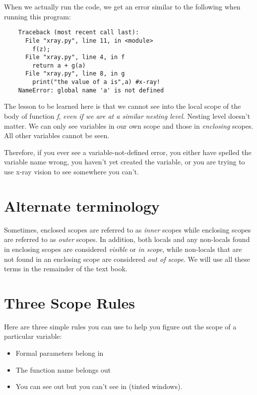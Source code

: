 When we actually run the code,
we get an error similar to the following when running this program:

\begin{verbatim}
    Traceback (most recent call last):
      File "xray.py", line 11, in <module>
        f(z);
      File "xray.py", line 4, in f
        return a + g(a)
      File "xray.py", line 8, in g
        print("the value of a is",a) #x-ray!
    NameError: global name 'a' is not defined
\end{verbatim}

The lesson to be learned here is
that we cannot see into
the local scope of the body of function {\it f},
{\it even if we are at a similar nesting level}.
Nesting level doesn't matter. We can only see variables
in our own scope and those in {\it enclosing} scopes.
All other variables cannot be seen.

Therefore, if you ever see a variable-not-defined error,
you either have spelled the variable name wrong, you haven't
yet created the variable, or you are trying to use x-ray vision
to see somewhere you can't. 

\section{Alternate terminology}

Sometimes, enclosed scopes are referred to as {\it inner} scopes while
enclosing scopes are referred to as {\it outer} scopes. In addition,
both locals and any non-locals found in enclosing scopes are considered
{\it visible} or {\it in scope}, while non-locals that are not
found in an enclosing scope are considered {\it out of scope}.
We will use all these terms in the remainder of the text book.

\section{Three Scope Rules}

Here are three simple rules you can use to help you
figure out the scope of a particular variable:

\begin{itemize}
\item
        Formal parameters belong in
\item
        The function name belongs out
\item
        You can see out but you can't see in (tinted windows).
\end{itemize}

